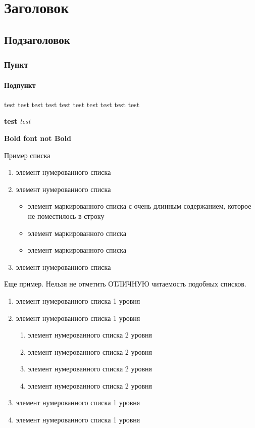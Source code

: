 \section{Заголовок}\label{_section}

\subsection{Подзаголовок}\label{_subsection}

\subsubsection{Пункт}\label{_subsubsection}

\paragraph{Подпункт}\label{_paragraph}

{\tiny test}
{\scriptsize test}
{\footnotesize test}
{\small test}
{\normalsize test}
{\large test}
{\Large test}
{\LARGE test}
{\huge test}
{\Huge test}

\textbf{test}
\textit{test}

\textbf{Bold font \normalfont{}not Bold}

Пример списка

\begin{enumerate}
    \item элемент нумерованного списка
    \item элемент нумерованного списка
    \begin{itemize}
        \item элемент маркированного списка 
            с очень длинным содержанием, которое 
            не поместилось в строку
        \item элемент маркированного списка
        \item элемент маркированного списка
    \end{itemize}
    \item элемент нумерованного списка
\end{enumerate}

Еще пример. Нельзя не отметить ОТЛИЧНУЮ читаемость подобных списков.

\begin{enumerate}
    \item элемент нумерованного списка 1 уровня
    \item элемент нумерованного списка 1 уровня
        \begin{enumerate}
        \item элемент нумерованного списка 2 уровня
        \item элемент нумерованного списка 2 уровня
        \item элемент нумерованного списка 2 уровня
        \item элемент нумерованного списка 2 уровня
    \end{enumerate}
    \item элемент нумерованного списка 1 уровня
    \item элемент нумерованного списка 1 уровня
\end{enumerate}

